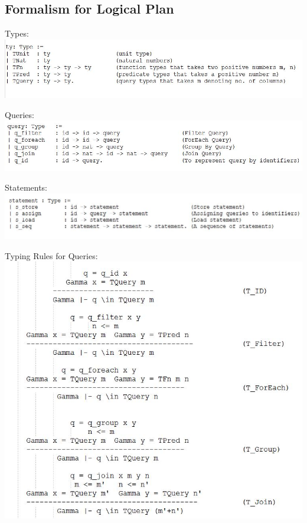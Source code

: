 \subsection{Formalism for Logical Plan}
\begin{frame}{Types:}
\includegraphics[scale=0.45]{Images/Types.JPG} 
\end{frame}

\begin{frame}{Queries: }
\includegraphics[scale=0.45]{Images/Queries.JPG} 
\end{frame} 

\begin{frame}{Statements: }
\includegraphics[scale =0.40]{Images/Statements.JPG} 
\end{frame} 

\begin{frame}{Typing Rules for Queries: }
\includegraphics[scale =0.35]{Images/TypingRules_Query.JPG} 
\end{frame} 

